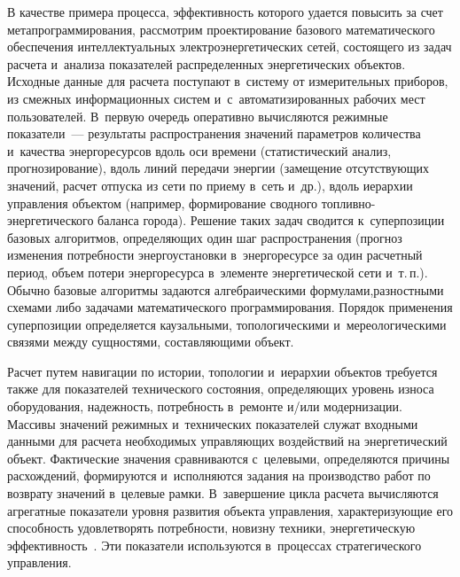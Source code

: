 \begin{multicols}{2}
   В качестве примера процесса, эффективность которого удается повысить за 
счет метапрограммирования, рассмотрим проектирование базового 
математического обеспечения интеллектуальных электроэнергетических сетей, 
состоящего из задач расчета и~анализа показателей распределенных 
энергетических объектов. Исходные данные для расчета поступают в~систему 
от измерительных приборов, из смежных информационных систем 
и~с~автоматизированных рабочих мест пользователей. В~первую очередь 
оперативно вычисляются режимные показатели~--- результаты 
распространения значений параметров количества и~качества энергоресурсов 
вдоль оси времени (статистический анализ, прогнозирование), вдоль линий 
передачи энергии (замещение отсутствующих значений, расчет отпуска из сети 
по приему в~сеть и~др.), вдоль иерархии управления объектом (например, 
формирование сводного топ\-лив\-но-энер\-ге\-ти\-че\-ско\-го баланса города). 
Решение таких задач сводится к~суперпозиции базовых алгоритмов, 
определяющих один шаг распространения (прогноз изменения потребности 
энергоустановки в~энергоресурсе за один расчетный период, объем потери 
энергоресурса в~элементе энергетической сети и~т.\,п.). Обычно базовые 
алгоритмы задаются алгебраическими формулами,\linebreak разностными схемами либо 
задачами математического программирования. Порядок применения\linebreak 
суперпозиции определяется каузальными, топологическими 
и~мереологическими связями между сущностями, составляющими объект.
   
   Расчет путем навигации по истории, топологии и~иерархии объектов 
требуется также для показателей технического состояния, определяющих 
уровень износа оборудования, надежность, потребность в~ремонте и/или 
модернизации. Массивы значений режимных и~технических показателей 
служат входными данными для расчета необходи\-мых управляющих 
воздействий на энергетический объект. Фактические значения сравниваются 
с~целевыми, определяются причины расхождений, формируются 
и~исполняются задания на производство работ по возврату значений в~целевые 
рамки. %
В~завершение цикла расчета вычисляются агрегатные показатели 
уровня развития объекта управ\-ле\-ния, характеризующие его способность 
удовлетворять потребности, новизну техники, энергетическую 
эффективность~\cite{22-kov}. Эти показатели используются в~процессах 
стратегического управления.
   

\end{multicols}

